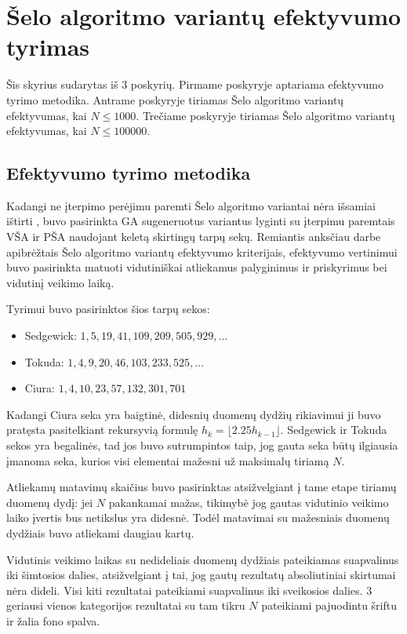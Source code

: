 \documentclass{VUMIFInfKursinis}
\begin{document}
\section{Šelo algoritmo variantų efektyvumo tyrimas}

Šis skyrius sudarytas iš 3 poskyrių.
Pirmame poskyryje aptariama efektyvumo tyrimo metodika.
Antrame poskyryje tiriamas Šelo algoritmo variantų efektyvumas, kai $N \leq 1000$.
Trečiame poskyryje tiriamas Šelo algoritmo variantų efektyvumas, kai $N \leq 100000$.

\subsection{Efektyvumo tyrimo metodika}

Kadangi ne įterpimo perėjimu paremti Šelo algoritmo variantai nėra išsamiai ištirti \cite{brejova2001analyzing},
buvo pasirinkta GA sugeneruotus variantus lyginti su įterpimu paremtais VŠA ir PŠA naudojant keletą skirtingų tarpų sekų.
Remiantis anksčiau darbe apibrėžtais Šelo algoritmo variantų efektyvumo kriterijais,
efektyvumo vertinimui buvo pasirinkta matuoti vidutiniškai atliekamus palyginimus ir priskyrimus bei vidutinį veikimo laiką.  

Tyrimui buvo pasirinktos šios tarpų sekos:
\begin{itemize}
  \item Sedgewick: $1, 5, 19, 41, 109, 209, 505, 929, \ldots$ \cite{SEDGEWICK1986159}
  \item Tokuda: $1, 4, 9, 20, 46, 103, 233, 525, \ldots $ \cite{10.5555/645569.659879}
  \item Ciura: $1, 4, 10, 23, 57, 132, 301, 701$ \cite{ciura2001best}
\end{itemize}
Kadangi Ciura seka yra baigtinė, didesnių duomenų dydžių rikiavimui ji buvo pratęsta pasitelkiant rekursyvią formulę $h_{k}=\lfloor 2.25h_{k-1}\rfloor$.
Sedgewick ir Tokuda sekos yra begalinės, tad jos buvo sutrumpintos taip, jog gauta seka būtų ilgiausia įmanoma seka, kurios visi elementai mažesni už maksimalų tiriamą $N$.

Atliekamų matavimų skaičius buvo pasirinktas atsižvelgiant į tame etape tiriamų duomenų dydį: jei $N$ pakankamai mažas,
tikimybė jog gautas vidutinio veikimo laiko įvertis bus netikslus yra didesnė.
Todėl matavimai su mažesniais duomenų dydžiais buvo atliekami daugiau kartų.

Vidutinis veikimo laikas su nedideliais duomenų dydžiais pateikiamas suapvalinus iki šimtosios dalies,
atsižvelgiant į tai, jog gautų rezultatų absoliutiniai skirtumai nėra dideli.
Visi kiti rezultatai pateikiami suapvalinus iki sveikosios dalies.
3 geriausi vienos kategorijos rezultatai su tam tikru $N$ pateikiami pajuodintu šriftu ir žalia fono spalva.
\end{document}
